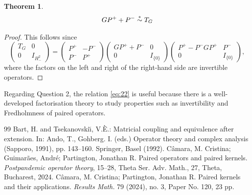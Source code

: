 \documentclass[10pt,a4paper]{amsart}
\newtheorem{thm}{Theorem}[section]
\def\beq{\begin{equation}}
\def\eeq{\end{equation}}
\newcommand{\simast}{%
    \ensuremath{%
       \stackrel{\mathsf{\ast}}{\sim}}}
\begin{document}
\begin{thm}\label{thm:2.1aug3}
\beq\label{eq:22}
GP^++P^- \simast T_G
\eeq
\end{thm}

\begin{proof}
This follows since
\[
\begin{pmatrix}
T_G & 0 \\ 0 & I_{H^2_-}
\end{pmatrix}
=
\begin{pmatrix}
P^+ & -P^- \\ P^- & P^+ 
\end{pmatrix}
\begin{pmatrix}
GP^++P^- & 0 \\ 0 & I_{\{0\}}
\end{pmatrix}
\begin{pmatrix}
P^+ -P^-GP^+ & P^- \\ 0 & I_{\{0\}}
\end{pmatrix},
\]
where the factors on the left and right of the right-hand side are invertible operators.
\end{proof}

Regarding Question 2, the relation \eqref{eq:22} is useful because there is a well-developed
factorisation theory to study properties such as invertibility and Fredholmness of paired operators.


\begin{thebibliography}{99}
 Bart, H. and Tsekanovski\u\i, V.\`E.: Matricial coupling and equivalence after extension. In: Ando, T., Gohberg. I. (eds.) Operator theory and complex analysis (Sapporo, 1991), pp. 143--160. Springer, Basel (1992).
 C\^amara, M. Cristina; Guimar\~{a}es, Andr\'e; Partington, Jonathan R. Paired operators and paired kernels. {\em Postpandemic operator theory}, 15--28, Theta Ser. Adv. Math., 27, Theta, Bucharest, 2024.
 C\^amara, M. Cristina; Partington, Jonathan R. Paired kernels and their applications. {\em Results Math.} 79 (2024), no. 3, Paper No. 120, 23 pp.
\end{thebibliography}
\end{document}
